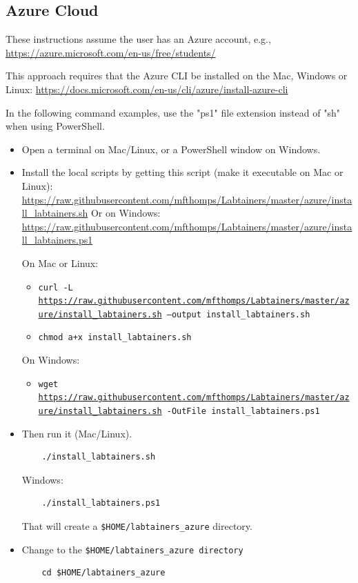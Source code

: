 \documentclass[12pt]{article}
\begin{document}
\subsection{Azure Cloud}
These instructions assume the user 
has an Azure account, e.g., \url{https://azure.microsoft.com/en-us/free/students/}

This approach requires that the Azure CLI be installed on  the Mac, Windows or Linux:
\url{https://docs.microsoft.com/en-us/cli/azure/install-azure-cli}

In the following command examples, use the "ps1" file extension instead of "sh" when using PowerShell.
\begin{itemize}
\item Open a terminal on Mac/Linux, or a PowerShell window on Windows.
\item Install the local scripts by getting this script (make it executable on Mac or Linux):
\url{https://raw.githubusercontent.com/mfthomps/Labtainers/master/azure/install\_labtainers.sh}
Or on Windows:
\url{https://raw.githubusercontent.com/mfthomps/Labtainers/master/azure/install\_labtainers.ps1}

On Mac or Linux:
\begin{itemize}
\item {\tt curl -L \url{https://raw.githubusercontent.com/mfthomps/Labtainers/master/azure/install\_labtainers.sh}  --output install\_labtainers.sh}
\item  {\tt chmod a+x install\_labtainers.sh}
\end{itemize}
\noindent On Windows:
\begin{itemize}
\item {\tt wget \url{https://raw.githubusercontent.com/mfthomps/Labtainers/master/azure/install\_labtainers.sh} -OutFile install\_labtainers.ps1}
\end{itemize}

\item Then run it (Mac/Linux).   
\begin{verbatim}
    ./install_labtainers.sh
\end{verbatim}
\noindent Windows:
\begin{verbatim}
    ./install_labtainers.ps1
\end{verbatim}

\noindent That will create a {\tt \$HOME/labtainers\_azure} directory.  

\item Change to the {\tt \$HOME/labtainers\_azure directory}
\begin{verbatim}
    cd $HOME/labtainers_azure
\end{verbatim}


\end{itemize}
\end{document}
